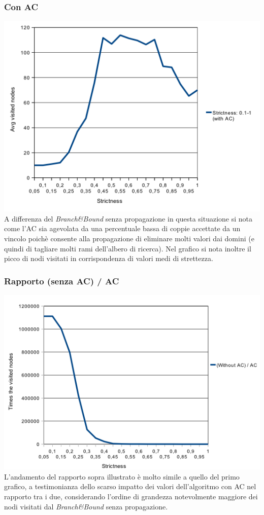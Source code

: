 \documentclass[a4paper,12pt,italian]{article}
\begin{document}
\subsubsection{Con AC}
\includegraphics[scale=0.8]{strictAC.png}
\\
A differenza del \textit{Branch\&Bound} senza propagazione in questa situazione si nota come l'AC sia
agevolata da una percentuale bassa di coppie accettate da un vincolo poich\`e consente
alla propagazione di eliminare molti valori dai domini (e quindi di
tagliare molti rami dell'albero di ricerca). Nel grafico si
nota inoltre il picco di nodi visitati in corrispondenza di valori medi di strettezza.

\subsubsection{Rapporto (senza AC) / AC}
\includegraphics[scale=0.8]{strictNodesQuotient.png}
\\
L'andamento del rapporto sopra illustrato \`e molto simile a quello del primo grafico, a testimonianza
dello scarso impatto dei valori dell'algoritmo con AC nel rapporto tra i due, considerando l'ordine di grandezza
notevolmente maggiore dei nodi visitati dal \textit{Branch\&Bound}
senza propagazione.
\end{document}
